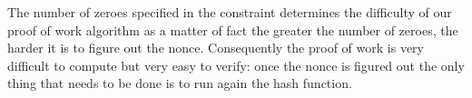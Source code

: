 \documentclass[12pt]{article}
\begin{document}
The number of zeroes specified in the constraint determines the difficulty of our proof of work algorithm as a matter of fact the greater the number of zeroes, the harder it is to figure out the nonce. Consequently the proof of work is very difficult to compute but very easy to verify: once the nonce is figured out the only thing that needs to be done is to run again the hash function. 


\end{document}
